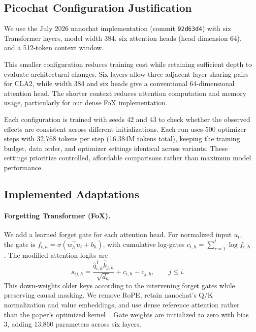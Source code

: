 \documentclass[11pt]{article}
\begin{document}
\subsection{Picochat Configuration Justification}
We use the July 2026 nanochat implementation
(commit \texttt{92d63d4}) with six Transformer layers,
model width 384, six attention heads (head dimension 64),
and a 512-token context window.

This smaller configuration reduces training cost while
retaining sufficient depth to evaluate architectural changes.
Six layers allow three adjacent-layer sharing pairs for
CLA2, while width 384 and six heads give a conventional
64-dimensional attention head. The shorter context reduces
attention computation and memory usage, particularly for
our dense FoX implementation.

Each configuration is trained with seeds 42 and 43 to check
whether the observed effects are consistent across different
initializations. Each run uses 500 optimizer steps with
32,768 tokens per step (16.384M tokens total), keeping the
training budget, data order, and optimizer settings identical
across variants. These settings prioritize controlled,
affordable comparisons rather than maximum model performance.



\subsection{Implemented Adaptations}

\paragraph{Forgetting Transformer (FoX).}
We add a learned forget gate for each attention head. For
normalized input $u_t$, the gate is
$f_{t,h}=\sigma(w_h^\top u_t+b_h)$, with cumulative log-gates
$c_{t,h}=\sum_{r=1}^{t}\log f_{r,h}$. The modified attention
logits are
\begin{equation}
s_{ij,h} =
\frac{\widehat q_{i,h}^{\mathsf T}\widehat k_{j,h}}{\sqrt{d_h}}
+c_{i,h}-c_{j,h}, \qquad j\leq i.
\end{equation}
This down-weights older keys according to the intervening
forget gates while preserving causal masking. We remove RoPE,
retain nanochat's Q/K normalization and value embeddings, and
use dense reference attention rather than the paper's optimized
kernel~\cite{fox}. Gate weights are initialized to zero with
bias 3, adding 13,860 parameters across six layers.
\end{document}

